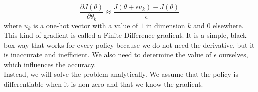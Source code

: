\begin{equation}
\frac{\partial J(\theta)}{\partial \theta_k} \approx \frac{J(\theta + \epsilon u_k) - J(\theta)}{\epsilon}
\end{equation}
where $u_k$ is a one-hot vector with a value of $1$ in dimension $k$ and $0$ elsewhere. This kind of gradient is called a Finite Difference gradient. It is a simple, black-box way that works for every policy because we do not need the derivative, but it is inaccurate and inefficient. We also need to determine the value of $\epsilon$ ourselves, which influences the accuracy.\\

Instead, we will solve the problem analytically. We assume that the policy is differentiable when it is non-zero and that we know the gradient.



